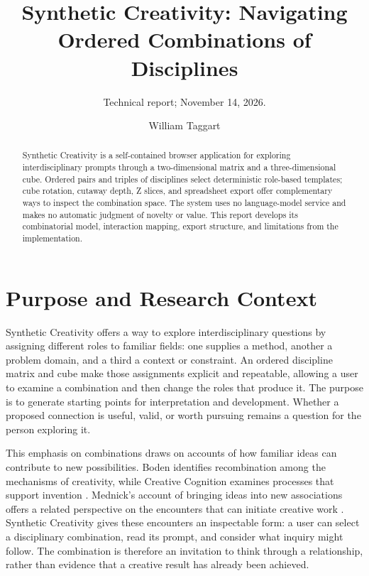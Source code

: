 \documentclass[manuscript,screen,nonacm]{acmart}
\title{Synthetic Creativity: Navigating Ordered Combinations of Disciplines}
\subtitle{Technical report; November 14, 2026.}
\author{William Taggart}
\affiliation{\department{Modern and Classical Languages and Literatures}\institution{Virginia Tech}\city{Blacksburg}\state{Virginia}\country{USA}}
\begin{document}
\begin{abstract}
Synthetic Creativity is a self-contained browser application for exploring interdisciplinary prompts through a two-dimensional matrix and a three-dimensional cube. Ordered pairs and triples of disciplines select deterministic role-based templates; cube rotation, cutaway depth, Z slices, and spreadsheet export offer complementary ways to inspect the combination space. The system uses no language-model service and makes no automatic judgment of novelty or value. This report develops its combinatorial model, interaction mapping, export structure, and limitations from the implementation.
\end{abstract}
\maketitle
\section{Purpose and Research Context}

Synthetic Creativity offers a way to explore interdisciplinary questions by assigning different roles to familiar fields: one supplies a method, another a problem domain, and a third a context or constraint. An ordered discipline matrix and cube make those assignments explicit and repeatable, allowing a user to examine a combination and then change the roles that produce it. The purpose is to generate starting points for interpretation and development. Whether a proposed connection is useful, valid, or worth pursuing remains a question for the person exploring it.

This emphasis on combinations draws on accounts of how familiar ideas can contribute to new possibilities. Boden identifies recombination among the mechanisms of creativity, while Creative Cognition examines processes that support invention \cite{boden,finke}. Mednick's account of bringing ideas into new associations offers a related perspective on the encounters that can initiate creative work \cite{mednick}. Synthetic Creativity gives these encounters an inspectable form: a user can select a disciplinary combination, read its prompt, and consider what inquiry might follow. The combination is therefore an invitation to think through a relationship, rather than evidence that a creative result has already been achieved.
\end{document}
